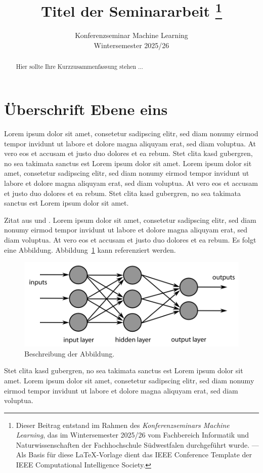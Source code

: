 \documentclass[a4paper, twoside]{IEEEtran}
\title{Titel der Seminararbeit
  \thanks{Dieser Beitrag entstand im Rahmen des \emph{Konferenzseminars Machine Learning}, das im Wintersemester 2025/26 vom Fachbereich Informatik und Naturwissenschaften der Fachhochschule Südwestfalen durchgeführt wurde. --- Als Basis für diese \LaTeX-Vorlage dient das IEEE Conference Template der IEEE Computational Intelligence Society.}}
\author{
  \IEEEauthorblockN{Ihr Name\\}
  \IEEEauthorblockA{Fachhochschule Südwestfalen}
  
  \vspace{3mm}
  Konferenzseminar Machine Learning\\
  Wintersemester 2025/26
}
\begin{document}
\maketitle

\begin{abstract}
Hier sollte Ihre Kurzzusammenfassung stehen ...
\end{abstract}

\section{Überschrift Ebene eins}

Lorem ipsum dolor sit amet, consetetur sadipscing elitr, sed diam nonumy eirmod tempor invidunt ut labore et dolore magna aliquyam erat, sed diam voluptua. At vero eos et accusam et justo duo dolores et ea rebum. Stet clita kasd gubergren, no sea takimata sanctus est Lorem ipsum dolor sit amet. Lorem ipsum dolor sit amet, consetetur sadipscing elitr, sed diam nonumy eirmod tempor invidunt ut labore et dolore magna aliquyam erat, sed diam voluptua. At vero eos et accusam et justo duo dolores et ea rebum. Stet clita kasd gubergren, no sea takimata sanctus est Lorem ipsum dolor sit amet.

Zitat aus \cite{scheme} und \cite[17]{knuth}. Lorem ipsum dolor sit amet, consetetur sadipscing elitr, sed diam nonumy eirmod tempor invidunt ut labore et dolore magna aliquyam erat, sed diam voluptua. At vero eos et accusam et justo duo dolores et ea rebum.
Es folgt eine Abbildung. Abbildung~\ref{abbildung1} kann referenziert werden.

\begin{figure}[htbp]
\centering
\includegraphics[width=\columnwidth]{deeplearning}
\caption{Beschreibung der Abbildung.}
\label{abbildung1}
\end{figure}

Stet clita kasd gubergren, no sea takimata sanctus est Lorem ipsum dolor sit amet. Lorem ipsum dolor sit amet, consetetur sadipscing elitr, sed diam nonumy eirmod tempor invidunt ut labore et dolore magna aliquyam erat, sed diam voluptua.
\end{document}
